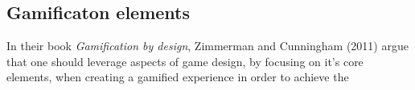 \subsection{Gamificaton elements}
In their book \textit{Gamification by design}, Zimmerman and Cunningham (2011) argue that one should leverage aspects of game design, by focusing on it's core elements, when creating a gamified experience in order to achieve the
